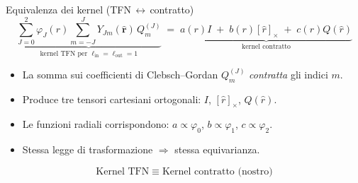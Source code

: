 \documentclass[aspectratio=32,8pt]{beamer}
\begin{document}
\begin{frame}[fragile]{Equivalenza dei kernel (TFN\,$\leftrightarrow$\,contratto)}
\small
\[
\underbrace{\sum_{\scriptstyle J=0}^{2}\!\varphi_J(r)\sum_{m=-J}^{J}Y_{Jm}(\hat{\mathbf r})\,Q^{(J)}_{m}}_{\text{kernel TFN per }\ell_{\text{in}}=\ell_{\text{out}}=1}
\;=\;
\underbrace{a(r)I\; +\; b(r)[\hat r]_\times\; +\; c(r)Q(\hat r)}_{\text{kernel contratto}}
\]
\vspace{0.5em}
\begin{itemize}
  \item La somma sui coefficienti di Clebsch--Gordan $Q^{(J)}_{m}$ \emph{contratta} gli indici $m$.
  \item Produce tre tensori cartesiani ortogonali: $I$, $[\hat r]_\times$, $Q(\hat r)$.
  \item Le funzioni radiali corrispondono: $a\!\propto\!\varphi_0$, $b\!\propto\!\varphi_1$, $c\!\propto\!\varphi_2$.
  \item Stessa legge di trasformazione $\Rightarrow$ stessa equivarianza.
\end{itemize}
\vspace{-0.5em}
\[
\boxed{\text{Kernel TFN}\;\equiv\;\text{Kernel contratto (nostro)}}
\]
\end{frame}
\end{document}
